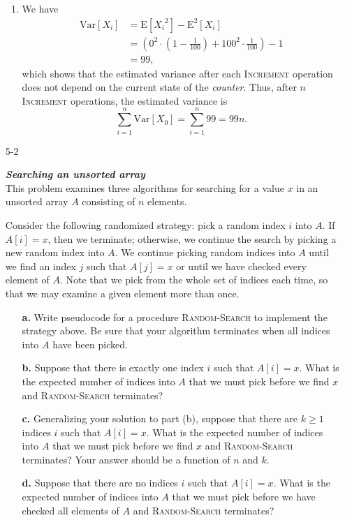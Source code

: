 \begin{enumerate}
\begin{framed}
\begin{enumerate}
\item We have
\begin{equation*}
\begin{aligned}
  \text{Var}[X_i] &= \text{E}[{X_i}^2] - \text{E}^2[X_i]\\
                  &= \left( 0^2 \cdot \left(1 - \frac{1}{100}\right) + 100^2 \cdot \frac{1}{100} \right) - 1\\
                  &= 99,
\end{aligned}
\end{equation*}
which shows that the estimated variance after each \textsc{Increment} operation
does not depend on the current state of the \emph{counter}. Thus, after $n$
\textsc{Increment} operations, the
estimated variance is
\[
  \sum_{i = 1}^{n} \text{Var}[X_0] = \sum_{i = 1}^{n} 99 = 99n.
\]
\end{enumerate}
\end{framed}

\newpage

\item[5{-}2]{\textbf{\emph{Searching an unsorted array}}\\
This problem examines three algorithms for searching for a value $x$ in an
unsorted array $A$ consisting of $n$ elements.

Consider the following randomized strategy: pick a random index $i$ into $A$. If
$A[i] = x$, then we terminate; otherwise, we continue the search by picking
a new random index into $A$. We continue picking random indices into $A$ until
we find an index $j$ such that $A[j] = x$ or until we have checked every element
of $A$. Note that we pick from the whole set of indices each time, so that we
may examine a given element more than once.

\begin{enumerate}
\item[\textbf{a.}] Write pseudocode for a procedure \textsc{Random-Search} to
implement the strategy above. Be sure that your algorithm terminates when all
indices into $A$ have been picked.
\item[\textbf{b.}] Suppose that there is exactly one index $i$ such that
$A[i] = x$. What is the expected number of indices into $A$ that we must pick
before we find $x$ and \textsc{Random-Search} terminates?
\item[\textbf{c.}] Generalizing your solution to part (b), suppose that there
are $k \ge 1$ indices $i$ such that $A[i] = x$. What is the expected number of
indices into $A$ that we must pick before we find $x$ and \textsc{Random-Search}
terminates? Your answer should be a function of $n$ and $k$.
\item[\textbf{d.}] Suppose that there are no indices $i$ such that $A[i] = x$.
What is the expected number of indices into $A$ that we must pick before we
have checked all elements of $A$ and \textsc{Random-Search} terminates?
\end{enumerate}

}
\end{enumerate}
